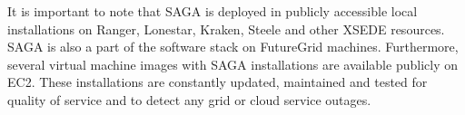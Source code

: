 \documentclass[]{svjour3}
\begin{document}
It is important to note that SAGA is deployed in publicly accessible
local installations on Ranger, Lonestar, Kraken, Steele and other
XSEDE resources. SAGA is also a part of the software stack on
FutureGrid machines. Furthermore, several virtual machine images with
SAGA installations are available publicly on EC2. These installations
are constantly updated, maintained and tested for quality of service
and to detect any grid or cloud service outages.

\end{document}
